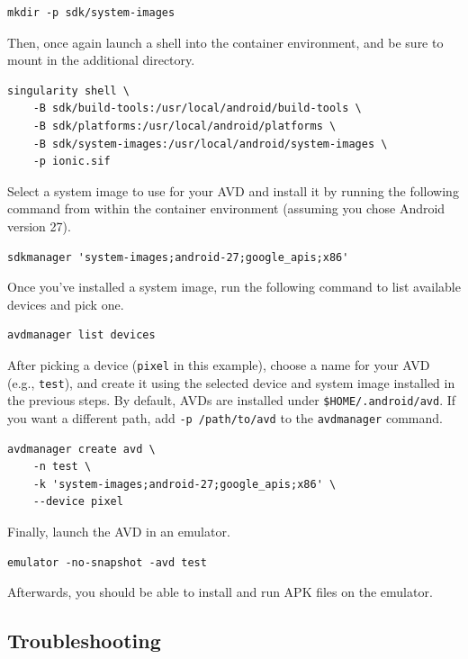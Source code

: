 \documentclass[12pt]{report}
\begin{document}
\begin{verbatim}
mkdir -p sdk/system-images
\end{verbatim}

Then, once again launch a shell into the container environment, and be sure to
mount in the additional directory.

\begin{verbatim}
singularity shell \
    -B sdk/build-tools:/usr/local/android/build-tools \
    -B sdk/platforms:/usr/local/android/platforms \
    -B sdk/system-images:/usr/local/android/system-images \
    -p ionic.sif
\end{verbatim}

Select a system image to use for your AVD and install it by running the
following command from within the container environment (assuming you chose
Android version 27).

\begin{verbatim}
sdkmanager 'system-images;android-27;google_apis;x86'
\end{verbatim}

Once you've installed a system image, run the following command to list
available devices and pick one.

\begin{verbatim}
avdmanager list devices
\end{verbatim}

After picking a device (\texttt{pixel} in this example), choose a name for your
AVD (e.g., \texttt{test}), and create it using the selected device and system
image installed in the previous steps. By default, AVDs are installed under
\texttt{\$HOME/.android/avd}. If you want a different path, add \texttt{-p
/path/to/avd} to the \texttt{avdmanager} command.

\begin{verbatim}
avdmanager create avd \
    -n test \
    -k 'system-images;android-27;google_apis;x86' \
    --device pixel
\end{verbatim}

Finally, launch the AVD in an emulator.

\begin{verbatim}
emulator -no-snapshot -avd test
\end{verbatim}

Afterwards, you should be able to install and run APK files on the emulator.

        \subsection{Troubleshooting}
\end{document}
